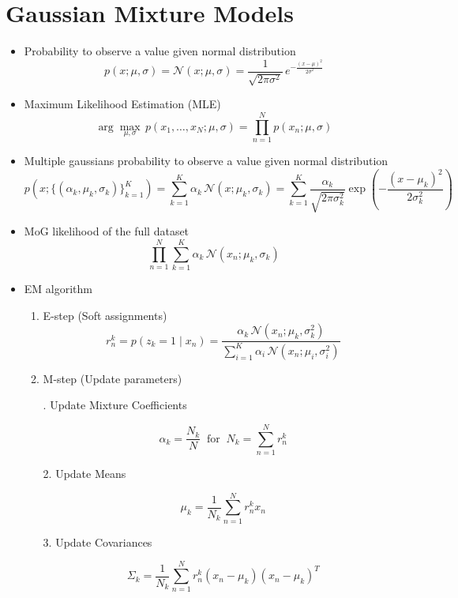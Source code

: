 \documentclass[11pt]{article}
\begin{document}
\section{Gaussian Mixture Models}
\begin{itemize}
	\item Probability to observe a value given normal distribution
	      \[
		      p(x; \mu, \sigma) = \mathcal{N}(x; \mu, \sigma) = \frac{1}{\sqrt{2\pi\sigma^2}} \, e^{ -\frac{(x - \mu)^2}{2\sigma^2} }
	      \]

	\item Maximum Likelihood Estimation (MLE)
	      \[
		      \arg\max_{\mu, \sigma} \, p(x_1, \dots, x_N; \mu, \sigma) = \prod_{n=1}^{N} p(x_n; \mu, \sigma)
	      \]

	\item Multiple gaussians probability to observe a value given normal distribution
	      \[
		      p(x; \{(\alpha_k, \mu_k, \sigma_k)\}_{k=1}^K)
		      = \sum_{k=1}^{K} \alpha_k \, \mathcal{N}(x; \mu_k, \sigma_k)
		      = \sum_{k=1}^{K} \frac{\alpha_k}{\sqrt{2\pi\sigma_k^2}}
		      \exp\left( -\frac{(x - \mu_k)^2}{2\sigma_k^2} \right)
	      \]

	\item MoG likelihood of the full dataset
	      \[
		      \prod_{n=1}^{N} \sum_{k=1}^{K} \alpha_k \, \mathcal{N}(x_n; \mu_k, \sigma_k)
	      \]
	\item EM algorithm
	      \begin{enumerate}
		      \item E-step (Soft assignments)
		            \[
			            r_n^k = p(z_k = 1 \mid x_n)
			            = \frac{ \alpha_k \, \mathcal{N}(x_n; \mu_k, \sigma_k^2) }
			            { \sum\limits_{i=1}^{K} \alpha_i \, \mathcal{N}(x_n; \mu_i, \sigma_i^2) }
		            \]
		      \item M-step (Update parameters)

		            . Update Mixture Coefficients

		            \[
			            \alpha_k = \frac{N_k}{N}
			            \; \; \text{for} \; \;
			            N_k = \sum_{n=1}^{N} r_n^k
		            \]

		            2. Update Means

		            \[
			            \mu_k = \frac{1}{N_k} \sum_{n=1}^{N} r_n^k x_n
		            \]

		            3. Update Covariances

		            \[
			            \Sigma_k = \frac{1}{N_k} \sum_{n=1}^{N} r_n^k (x_n - \mu_k)(x_n - \mu_k)^T
		            \]
	      \end{enumerate}

\end{itemize}
\end{document}
